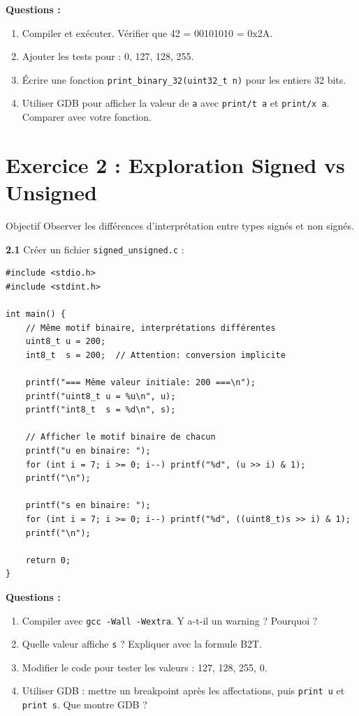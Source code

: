 \documentclass[10pt,a4paper]{article}
\begin{document}
\textbf{Questions :}
\begin{enumerate}[label=\alph*)]
    \item Compiler et exécuter. Vérifier que 42 = 00101010 = 0x2A.
    \item Ajouter les tests pour : 0, 127, 128, 255.
    \item Écrire une fonction \texttt{print\_binary\_32(uint32\_t n)} pour les entiers 32 bits.
    \item Utiliser GDB pour afficher la valeur de \texttt{a} avec \texttt{print/t a} et \texttt{print/x a}. Comparer avec votre fonction.
\end{enumerate}

\section{Exercice 2 : Exploration Signed vs Unsigned}

\begin{exercicebox}{Objectif}
Observer les différences d'interprétation entre types signés et non signés.
\end{exercicebox}

\textbf{2.1} Créer un fichier \texttt{signed\_unsigned.c} :

\begin{lstlisting}
#include <stdio.h>
#include <stdint.h>

int main() {
    // Même motif binaire, interprétations différentes
    uint8_t u = 200;
    int8_t  s = 200;  // Attention: conversion implicite
    
    printf("=== Même valeur initiale: 200 ===\n");
    printf("uint8_t u = %u\n", u);
    printf("int8_t  s = %d\n", s);
    
    // Afficher le motif binaire de chacun
    printf("u en binaire: ");
    for (int i = 7; i >= 0; i--) printf("%d", (u >> i) & 1);
    printf("\n");
    
    printf("s en binaire: ");
    for (int i = 7; i >= 0; i--) printf("%d", ((uint8_t)s >> i) & 1);
    printf("\n");
    
    return 0;
}
\end{lstlisting}

\textbf{Questions :}
\begin{enumerate}[label=\alph*)]
    \item Compiler avec \texttt{gcc -Wall -Wextra}. Y a-t-il un warning ? Pourquoi ?
    \item Quelle valeur affiche \texttt{s} ? Expliquer avec la formule B2T.
    \item Modifier le code pour tester les valeurs : 127, 128, 255, 0.
    \item Utiliser GDB : mettre un breakpoint après les affectations, puis \texttt{print u} et \texttt{print s}. Que montre GDB ?
\end{enumerate}
\end{document}

